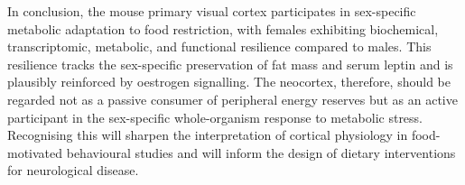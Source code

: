 \documentclass[11pt]{article}
\begin{document}
In conclusion, the mouse primary visual cortex participates in sex-specific metabolic adaptation to food restriction, with females exhibiting biochemical, transcriptomic, metabolic, and functional resilience compared to males. This resilience tracks the sex-specific preservation of fat mass and serum leptin and is plausibly reinforced by oestrogen signalling. The neocortex, therefore, should be regarded not as a passive consumer of peripheral energy reserves but as an active participant in the sex-specific whole-organism response to metabolic stress. Recognising this will sharpen the interpretation of cortical physiology in food-motivated behavioural studies and will inform the design of dietary interventions for neurological disease.


\end{document}
